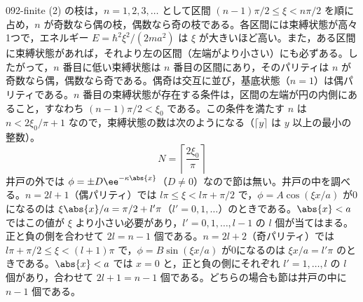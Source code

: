 \documentclass[uplatex,dvipdfmx,a4paper,11pt]{jsarticle}
\begin{document}
\begin{kaisetsu}{092-finite}
 (2) の枝は，$n=1,2,3,\dots$ として区間 $(n-1)\pi/2\le\xi<n\pi/2$ を順に占め，$n$ が奇数なら偶の枝，偶数なら奇の枝である。各区間には束縛状態が高々1つで，エネルギー $E=\hbar^{2}\xi^{2}/(2ma^{2})$ は $\xi$ が大きいほど高い。また，ある区間に束縛状態があれば，それより左の区間（左端がより小さい）にも必ずある。したがって，$n$ 番目に低い束縛状態は $n$ 番目の区間にあり，そのパリティは $n$ が奇数なら偶，偶数なら奇である。偶奇は交互に並び，基底状態（$n=1$）は偶パリティである。$n$ 番目の束縛状態が存在する条件は，区間の左端が円の内側にあること，すなわち $(n-1)\pi/2<\xi_{0}$ である。この条件を満たす $n$ は $n<2\xi_{0}/\pi+1$ なので，束縛状態の数は次のようになる（$\lceil y\rceil$ は $y$ 以上の最小の整数）。
\[ N=\left\lceil\frac{2\xi_{0}}{\pi}\right\rceil \]
 井戸の外では $\phi=\pm D\ee^{-\kappa\abs{x}}$（$D\ne 0$）なので節は無い。井戸の中を調べる。$n=2l+1$（偶パリティ）では $l\pi\le\xi<l\pi+\pi/2$ で，$\phi=A\cos(\xi x/a)$ が0になるのは $\xi\abs{x}/a=\pi/2+l'\pi$（$l'=0,1,\dots$）のときである。$\abs{x}<a$ ではこの値が $\xi$ より小さい必要があり，$l'=0,1,\dots,l-1$ の $l$ 個が当てはまる。正と負の側を合わせて $2l=n-1$ 個である。$n=2l+2$（奇パリティ）では $l\pi+\pi/2\le\xi<(l+1)\pi$ で，$\phi=B\sin(\xi x/a)$ が0になるのは $\xi x/a=l'\pi$ のときである。$\abs{x}<a$ では $x=0$ と，正と負の側にそれぞれ $l'=1,\dots,l$ の $l$ 個があり，合わせて $2l+1=n-1$ 個である。どちらの場合も節は井戸の中に $n-1$ 個である。

\end{kaisetsu}
\end{document}

